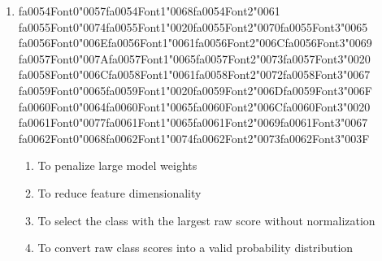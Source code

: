 \documentclass[12pt]{article}
\begin{document}
\begin{enumerate}[label=Q\arabic*.]
\item {\csname fa0054Font0\endcsname\char"0057}{\csname fa0054Font1\endcsname\char"0068}{\csname fa0054Font2\endcsname\char"0061} {\csname fa0055Font0\endcsname\char"0074}{\csname fa0055Font1\endcsname\char"0020}{\csname fa0055Font2\endcsname\char"0070}{\csname fa0055Font3\endcsname\char"0065} {\csname fa0056Font0\endcsname\char"006E}{\csname fa0056Font1\endcsname\char"0061}{\csname fa0056Font2\endcsname\char"006C}{\csname fa0056Font3\endcsname\char"0069} {\csname fa0057Font0\endcsname\char"007A}{\csname fa0057Font1\endcsname\char"0065}{\csname fa0057Font2\endcsname\char"0073}{\csname fa0057Font3\endcsname\char"0020} {\csname fa0058Font0\endcsname\char"006C}{\csname fa0058Font1\endcsname\char"0061}{\csname fa0058Font2\endcsname\char"0072}{\csname fa0058Font3\endcsname\char"0067} {\csname fa0059Font0\endcsname\char"0065}{\csname fa0059Font1\endcsname\char"0020}{\csname fa0059Font2\endcsname\char"006D}{\csname fa0059Font3\endcsname\char"006F} {\csname fa0060Font0\endcsname\char"0064}{\csname fa0060Font1\endcsname\char"0065}{\csname fa0060Font2\endcsname\char"006C}{\csname fa0060Font3\endcsname\char"0020} {\csname fa0061Font0\endcsname\char"0077}{\csname fa0061Font1\endcsname\char"0065}{\csname fa0061Font2\endcsname\char"0069}{\csname fa0061Font3\endcsname\char"0067} {\csname fa0062Font0\endcsname\char"0068}{\csname fa0062Font1\endcsname\char"0074}{\csname fa0062Font2\endcsname\char"0073}{\csname fa0062Font3\endcsname\char"003F}
\begin{enumerate}[label=(\Alph*)]
    \item To penalize large model weights
    \item To reduce feature dimensionality
    \item To select the class with the largest raw score without normalization
    \item To convert raw class scores into a valid probability distribution
\end{enumerate}

\end{enumerate}
\end{document}
